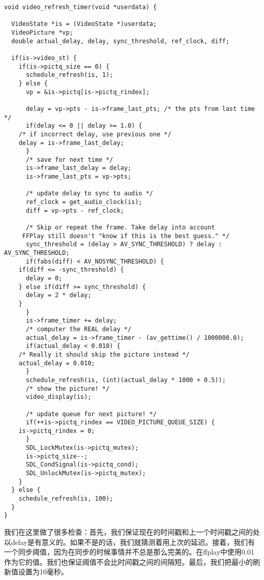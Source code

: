 \begin{lstlisting}
void video_refresh_timer(void *userdata) {

  VideoState *is = (VideoState *)userdata;
  VideoPicture *vp;
  double actual_delay, delay, sync_threshold, ref_clock, diff;

  if(is->video_st) {
    if(is->pictq_size == 0) {
      schedule_refresh(is, 1);
    } else {
      vp = &is->pictq[is->pictq_rindex];

      delay = vp->pts - is->frame_last_pts; /* the pts from last time */
      if(delay <= 0 || delay >= 1.0) {
    /* if incorrect delay, use previous one */
    delay = is->frame_last_delay;
      }
      /* save for next time */
      is->frame_last_delay = delay;
      is->frame_last_pts = vp->pts;

      /* update delay to sync to audio */
      ref_clock = get_audio_clock(is);
      diff = vp->pts - ref_clock;

      /* Skip or repeat the frame. Take delay into account
     FFPlay still doesn't "know if this is the best guess." */
      sync_threshold = (delay > AV_SYNC_THRESHOLD) ? delay : AV_SYNC_THRESHOLD;
      if(fabs(diff) < AV_NOSYNC_THRESHOLD) {
    if(diff <= -sync_threshold) {
      delay = 0;
    } else if(diff >= sync_threshold) {
      delay = 2 * delay;
    }
      }
      is->frame_timer += delay;
      /* computer the REAL delay */
      actual_delay = is->frame_timer - (av_gettime() / 1000000.0);
      if(actual_delay < 0.010) {
    /* Really it should skip the picture instead */
    actual_delay = 0.010;
      }
      schedule_refresh(is, (int)(actual_delay * 1000 + 0.5));
      /* show the picture! */
      video_display(is);

      /* update queue for next picture! */
      if(++is->pictq_rindex == VIDEO_PICTURE_QUEUE_SIZE) {
    is->pictq_rindex = 0;
      }
      SDL_LockMutex(is->pictq_mutex);
      is->pictq_size--;
      SDL_CondSignal(is->pictq_cond);
      SDL_UnlockMutex(is->pictq_mutex);
    }
  } else {
    schedule_refresh(is, 100);
  }
}
\end{lstlisting}

我们在这里做了很多检查：首先，我们保证现在的时间戳和上一个时间戳之间的处以delay是有意义的。如果不是的话，我们就猜测着用上次的延迟。接着，我们有一个同步阈值，因为在同步的时候事情并不总是那么完美的。在ffplay中使用0.01 作为它的值。我们也保证阈值不会比时间戳之间的间隔短。最后，我们把最小的刷新值设置为10毫秒。


